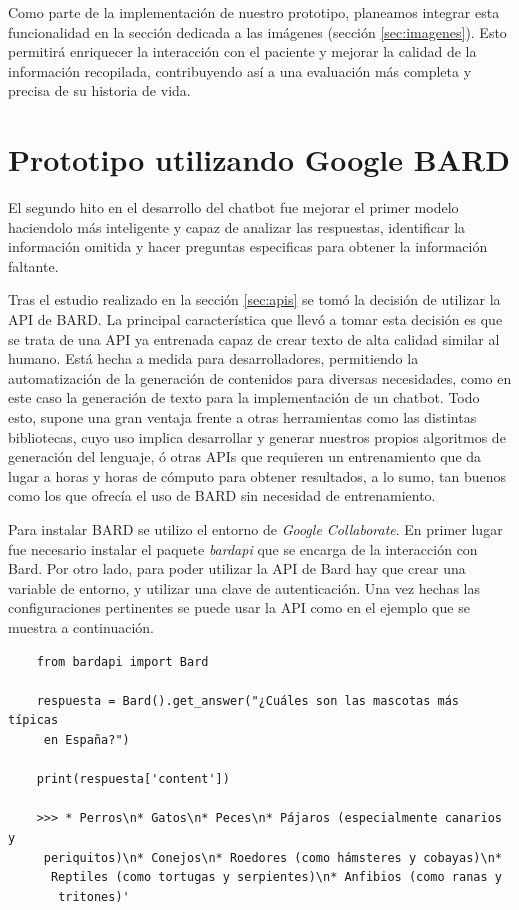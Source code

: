 Como parte de la implementación de nuestro prototipo, planeamos integrar esta funcionalidad en la sección dedicada a las imágenes (sección \ref{sec:imagenes}). Esto permitirá enriquecer la interacción con el paciente y mejorar la calidad de la información recopilada, contribuyendo así a una evaluación más completa y precisa de su historia de vida. 

\section{Prototipo utilizando Google BARD}
\label{sec:prototipoBARD}
El segundo hito en el desarrollo del chatbot fue mejorar el primer modelo haciendolo más inteligente y capaz de analizar las respuestas, identificar la información omitida y hacer preguntas especificas para obtener la información faltante. 

Tras el estudio realizado en la sección \ref{sec:apis} se tomó la decisión de utilizar la API de BARD. La principal característica que llevó a tomar esta decisión es que se trata de una API ya entrenada capaz de crear texto de alta calidad similar al humano. Está hecha a medida para desarrolladores, permitiendo la automatización de la generación de contenidos para diversas necesidades, como en este caso la generación de texto para la implementación de un chatbot. Todo esto, supone una gran ventaja frente a otras herramientas como las distintas bibliotecas, cuyo uso implica desarrollar y generar nuestros propios algoritmos de generación del lenguaje, ó otras APIs que requieren un entrenamiento que da lugar a horas y horas de cómputo para obtener resultados, a lo sumo, tan buenos como los que ofrecía el uso de BARD sin necesidad de entrenamiento. 

Para instalar BARD se utilizo el entorno de \textit{Google Collaborate}. En primer lugar fue necesario instalar el paquete \textit{bardapi} que se encarga de la interacción con Bard. Por otro lado, para poder utilizar la API de Bard hay que crear una variable de entorno, y utilizar una clave de autenticación. Una vez hechas las configuraciones pertinentes se puede usar la API como en el ejemplo que se muestra a continuación. 

\begin{verbatim}
	from bardapi import Bard
	
	respuesta = Bard().get_answer("¿Cuáles son las mascotas más típicas
	 en España?")
	
	print(respuesta['content'])
	
	>>> * Perros\n* Gatos\n* Peces\n* Pájaros (especialmente canarios y
	 periquitos)\n* Conejos\n* Roedores (como hámsteres y cobayas)\n*
	  Reptiles (como tortugas y serpientes)\n* Anfibios (como ranas y
	   tritones)'
\end{verbatim}


